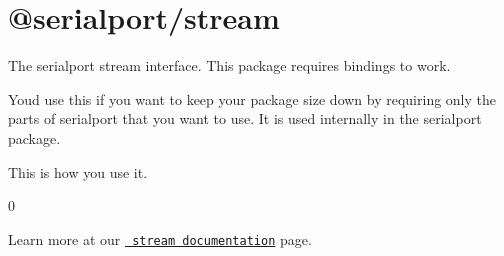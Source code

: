 \chapter{@serialport/stream}
\hypertarget{md_Dashboard_2node__modules_2_0dserialport_2stream_2README}{}\label{md_Dashboard_2node__modules_2_0dserialport_2stream_2README}
\label{md_Dashboard_2node__modules_2_0dserialport_2stream_2README_autotoc_md125}%
%
 The serialport stream interface. This package requires bindings to work.

You\textquotesingle{}d use this if you want to keep your package size down by requiring only the parts of serialport that you want to use. It is used internally in the {\ttfamily serialport} package.

This is how you use it.


\begin{DoxyCode}{0}

\end{DoxyCode}


Learn more at our \href{https://serialport.io/docs/api-stream}{\texttt{ stream documentation}} page. 